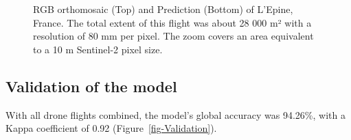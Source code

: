\documentclass[
  letterpaper,
  11pt,
  english,
  singlespacing,
  headsepline]{MastersDoctoralThesis}
\begin{document}
\begin{spacing}{1.5}
\begin{figure}


\caption{\label{fig-Dike}RGB orthomosaic (Top) and Prediction (Bottom)
of L'Epine, France. The total extent of this flight was about 28 000 m²
with a resolution of 80 mm per pixel. The zoom covers an area equivalent
to a 10 m Sentinel-2 pixel size.}

\end{figure}%

\subsection{Validation of the model}\label{validation-of-the-model}

With all drone flights combined, the model's global accuracy was
94.26\%, with a Kappa coefficient of 0.92 (Figure~\ref{fig-Validation}).

\begin{figure}

\end{figure}
\end{spacing}
\end{document}
